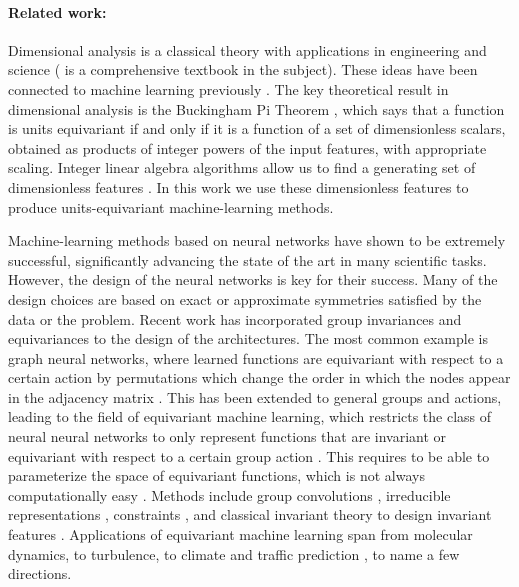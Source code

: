 \documentclass[twoside,11pt]{article}
\begin{document}
\paragraph{Related work:}
Dimensional analysis is a classical theory with applications in engineering and science (\citealt{barenblatt_1996} is a comprehensive textbook in the subject).
These ideas have been connected to machine learning previously \citep{rudolph1998context, frisone2019buckingham, bakarji2022dimensionally}. The key theoretical result in dimensional analysis is the Buckingham Pi Theorem \citep{buckingham1914pi}, which says that a function is units equivariant if and only if it is a function of a set of dimensionless scalars, obtained as products of integer powers of the input features, with appropriate scaling. Integer linear algebra algorithms allow us to find a generating set of  dimensionless features \citep{hubert2012rational}. In this work we use these dimensionless features to produce units-equivariant machine-learning methods.

Machine-learning methods based on neural networks have shown to be extremely successful, significantly advancing the state of the art in many scientific tasks. However, the design of the neural networks is key for their success. Many of the design choices are based on exact or approximate symmetries satisfied by the data or the problem. Recent work has incorporated group invariances and equivariances to the design of the architectures. The most common example is graph neural networks, where learned functions are equivariant with respect to a certain action by permutations which change the order in which the nodes appear in the adjacency matrix \citep{gilmer2017neural,duvenaud2015convolutional, chen2019cdsbm,gama2020graphs}. 
This has been extended to general groups and actions, leading to the field of equivariant machine learning, which restricts the class of neural neural networks to only represent functions that are invariant or equivariant with respect to a certain group action \citep{maron2018invariant}. This requires to be able to parameterize the space of equivariant functions, which is not always computationally easy \citep{xu2018powerful,morris2019higher,chen2019equivalence,chen2020can}. Methods include group convolutions \citep{cohen2016group,Cohen2016steerable,wang2020incorporating}, irreducible representations \citep{fuchs2020se,kondor2018n,thomas2018tensor,weiler20183d,cohen2018spherical,Weiler2019e2equivariant}, constraints \citep{finzi}, and classical invariant theory to design invariant features \citep{gripaios2021lorentz, haddadin2021invariant, villar}. 
Applications of equivariant machine learning span from molecular dynamics, to turbulence, to climate and traffic prediction \citep{batzner2021se,wang2020towards,bakarji2022dimensionally, kashinath2021physics, jin2020composing}, to name a few directions.
\end{document}
